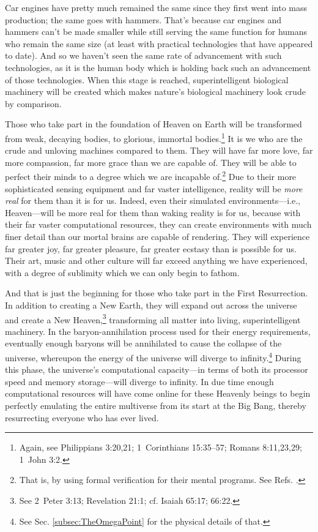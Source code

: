 \documentclass[letterpaper,12pt]{article}
\begin{document}
{    Car engines have pretty much remained the same since they first went into mass production; the same goes with hammers. That's because car engines and hammers can't be made smaller while still serving the same function for humans who remain the same size (at least with practical technologies that have appeared to date). And so we haven't seen the same rate of advancement with such technologies, as it is the human body which is holding back such an advancement of those technologies.} When this stage is reached, superintelligent biological machinery will be created which makes nature's biological machinery look crude by comparison.

Those who take part in the foundation of Heaven on Earth will be transformed from weak, decaying bodies, to glorious, immortal bodies.\footnote{Again, see Philippians 3:20,21; 1~Corinthians 15:35--57; Romans 8:11,23,29; 1~John 3:2.} It is we who are the crude and unloving machines compared to them. They will have far more love, far more compassion, far more grace than we are capable of. They will be able to perfect their minds to a degree which we are incapable of.\footnote{That is, by using formal verification for their mental programs. See Refs. .} Due to their more sophisticated sensing equipment and far vaster intelligence, reality will be \emph{more real} for them than it is for us. Indeed, even their simulated environments---i.e., Heaven---will be more real for them than waking reality is for us, because with their far vaster computational resources, they can create environments with much finer detail than our mortal brains are capable of rendering. They will experience far greater joy, far greater pleasure, far greater ecstasy than is possible for us. Their art, music and other culture will far exceed anything we have experienced, with a degree of sublimity which we can only begin to fathom.

And that is just the beginning for those who take part in the First Resurrection. In addition to creating a New Earth, they will expand out across the universe and create a New Heaven,\footnote{See 2~Peter 3:13; Revelation 21:1; cf. Isaiah 65:17; 66:22.} transforming all matter into living, superintelligent machinery. In the baryon-annihilation process used for their energy requirements, eventually enough baryons will be annihilated to cause the collapse of the universe, whereupon the energy of the universe will diverge to infinity.\footnote{See Sec. \ref{subsec:TheOmegaPoint} for the physical details of that.} During this phase, the universe's computational capacity---in terms of both its processor speed and memory storage---will diverge to infinity. In due time enough computational resources will have come online for these Heavenly beings to begin perfectly emulating the entire multiverse from its start at the Big Bang, thereby resurrecting everyone who has ever lived.
\end{document}
